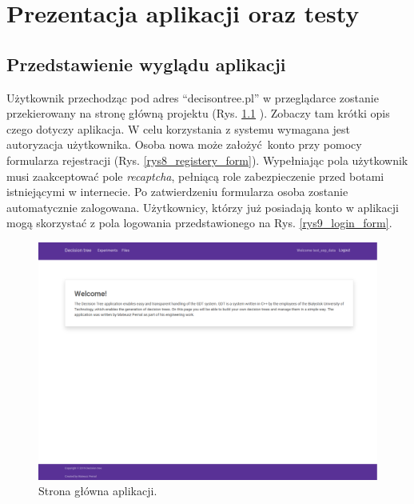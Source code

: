\chapter{Prezentacja aplikacji oraz testy}
\section{Przedstawienie wyglądu aplikacji}
Użytkownik przechodząc pod adres \enquote{decisontree.pl} w przeglądarce zostanie przekierowany na stronę główną projektu (Rys. \ref{rys7_home_page} ). Zobaczy tam krótki opis czego dotyczy aplikacja. W celu korzystania z systemu wymagana jest autoryzacja użytkownika. Osoba nowa może założyć konto przy pomocy formularza rejestracji (Rys. \ref{rys8_registery_form}). Wypełniając pola użytkownik musi zaakceptować pole \textit{recaptcha}, pełniącą role zabezpieczenie przed botami istniejącymi w internecie. Po zatwierdzeniu formularza osoba zostanie automatycznie zalogowana. Użytkownicy, którzy już posiadają konto w aplikacji mogą skorzystać z pola logowania przedstawionego na Rys. \ref{rys9_login_form}.

\begin{figure}[htb]
	\centering
	\includegraphics[width=15cm]{grafika/home_page.eps}
	\caption{Strona główna aplikacji.}
	\label{rys7_home_page}
\end{figure}

